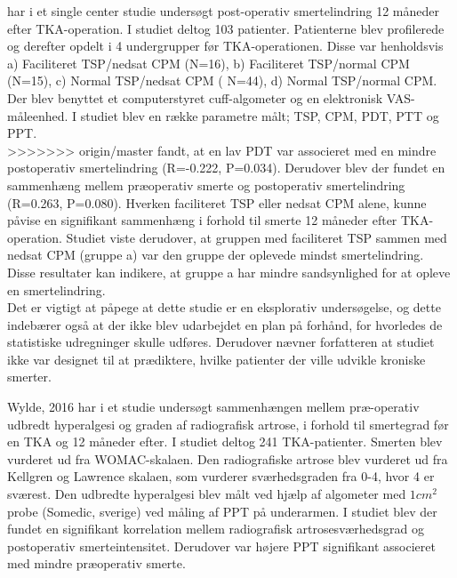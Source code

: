  har i et single center  studie undersøgt post-operativ smertelindring 12 måneder efter TKA-operation. I studiet deltog 103 patienter. Patienterne blev profilerede og derefter opdelt i 4 undergrupper før TKA-operationen. Disse var henholdsvis a)  Faciliteret TSP/nedsat CPM (N=16), b) Faciliteret TSP/normal CPM (N=15), c)  Normal TSP/nedsat CPM ( N=44), d) Normal TSP/normal CPM. Der blev benyttet et computerstyret cuff-algometer og en elektronisk VAS-måleenhed. I studiet blev en række parametre målt; TSP, CPM, PDT, PTT og PPT. \\
>>>>>>> origin/master
 fandt, at en lav PDT var associeret med en mindre postoperativ smertelindring (R=-0.222, P=0.034). Derudover blev der fundet en sammenhæng mellem præoperativ smerte og postoperativ smertelindring (R=0.263, P=0.080).
Hverken faciliteret TSP eller nedsat CPM alene, kunne påvise en signifikant sammenhæng i forhold til smerte 12 måneder efter TKA-operation. Studiet viste derudover, at gruppen med faciliteret TSP sammen med nedsat CPM (gruppe a) var den gruppe der oplevede mindst smertelindring.
Disse resultater kan indikere, at gruppe a har mindre sandsynlighed for at opleve en smertelindring.\\
Det er vigtigt at påpege at dette studie er en eksplorativ undersøgelse, og dette indebærer også at der ikke blev udarbejdet en plan på forhånd, for hvorledes de statistiske udregninger skulle udføres.
Derudover nævner forfatteren at studiet ikke var designet til at prædiktere, hvilke patienter der ville udvikle kroniske smerter. \citep{Petersen2016}

Wylde, 2016 har i et studie undersøgt sammenhængen mellem præ-operativ udbredt hyperalgesi og graden af radiografisk artrose, i forhold til smertegrad før en TKA og 12 måneder efter. I studiet deltog 241 TKA-patienter. Smerten blev vurderet ud fra WOMAC-skalaen. Den radiografiske artrose blev vurderet ud fra Kellgren og Lawrence skalaen, som vurderer sværhedsgraden fra 0-4, hvor 4 er sværest. Den udbredte hyperalgesi blev målt ved hjælp af algometer med $1 cm^{2}$ probe (Somedic, sverige) ved måling af PPT på underarmen.
I studiet blev der fundet en signifikant korrelation mellem radiografisk artrosesværhedsgrad og postoperativ smerteintensitet. Derudover var højere PPT signifikant associeret med mindre præoperativ smerte.	

